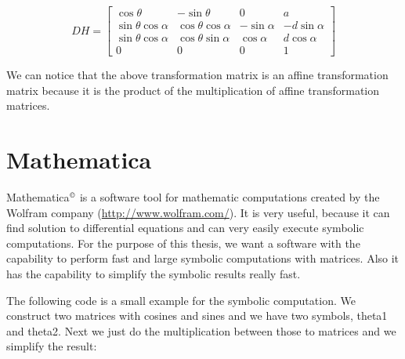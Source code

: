 \[
DH = 
\begin{bmatrix}
\cos\theta & -\sin\theta & 0 & a\\
\sin\theta\cos\alpha & \cos\theta\cos\alpha & -\sin\alpha & -d\sin\alpha\\
\sin\theta\cos\alpha & \cos\theta\sin\alpha & \cos\alpha & d\cos\alpha\\
0 & 0 & 0 & 1
\end{bmatrix}
\]

We can notice that the above transformation matrix is an affine transformation matrix because it is the product of the multiplication of affine transformation matrices.

\section{Mathematica}
Mathematica$^{\textrm{\copyright}}$ is a software tool for mathematic computations created by the Wolfram company (\url{http://www.wolfram.com/}). It is very useful, because it can find solution to differential equations and can very easily execute symbolic computations. For the purpose of this thesis, we want a software with the capability to perform fast and large symbolic computations with matrices. Also it has the capability to simplify the symbolic results really fast.

The following code is a small example for the symbolic computation. We construct two matrices with cosines and sines and we have two symbols, theta1 and theta2. Next we just do the multiplication between those to matrices and we simplify the result:

